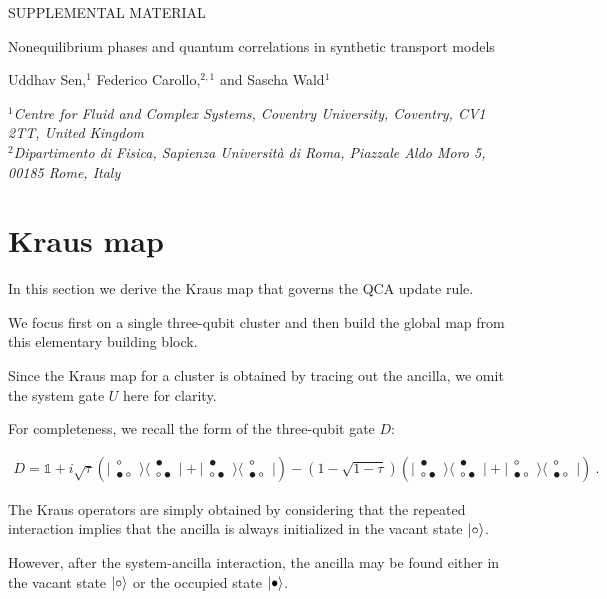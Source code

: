 \documentclass[aps,prl,twocolumn,groupedaddress,superscriptaddress,colorlinks,bookmarks=false,citecolor=darkspringgreen,linkcolor=darkolivegreen,urlcolor=navyblue]{revtex4-1}
\newcommand{\threestate}[3]{
\begin{matrix}
#1\\[-.25cm]
#2#3
\end{matrix}
}
\newcommand{\kett}[1]{\lvert #1 \rangle}
\newcommand{\brat}[1]{\langle #1 \rvert}
\newcommand{\papertitle}{
Nonequilibrium phases and quantum correlations in
synthetic transport models
}
\begin{document}
\setcounter{page}{1}
\begin{center}
{\Large SUPPLEMENTAL MATERIAL}
\end{center}
\begin{center}
\vspace{0.8cm}
{\Large \papertitle }
\end{center}
 \begin{center}
 Uddhav Sen,$^{1}$
 Federico Carollo,$^{2,1}$ and
 Sascha Wald$^{1}$
 \end{center}
 \begin{center}
 $^1${\em Centre for Fluid and Complex Systems, Coventry University, Coventry, CV1 2TT, United Kingdom}\\
 $^2${\em Dipartimento di Fisica, Sapienza Università di Roma, Piazzale Aldo Moro 5, 00185 Rome, Italy}
 \end{center}




\section{Kraus map}
In this section we derive the Kraus map that governs the QCA update rule.

We focus first on a single three-qubit cluster and then build the global map from this elementary building block.

Since the Kraus map for a cluster is obtained by tracing out the ancilla, we omit the system gate $U$ here for clarity.

For completeness, we recall the form of the three-qubit gate $D$:


\begin{align}
D=\mathds{1} + i\sqrt{\tau}(\kett{\threestate{\circ}{\bullet}{\circ}}\brat{\threestate{\bullet}{\circ}{\bullet}}
+\kett{\threestate{\bullet}{\circ}{\bullet}}\brat{\threestate{\circ}{\bullet}{\circ}})
- (1-\sqrt{1-\tau})(\kett{\threestate{\bullet}{\circ}{\bullet}}\brat{\threestate{\bullet}{\circ}{\bullet}}+ \kett{\threestate{\circ}{\bullet}{\circ}}\brat{\threestate{\circ}{\bullet}{\circ}}) \ .
\end{align}


The Kraus operators are simply obtained by considering that the repeated interaction implies that the ancilla is always initialized in the vacant state $\ket{\circ}$.

However, after the system-ancilla interaction, the ancilla may be found either in the vacant state $\ket{\circ}$ or the occupied state $\ket{\bullet}$.
\end{document}
